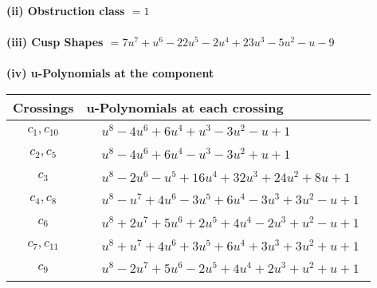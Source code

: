 \documentclass[1p]{elsarticle_modified}
\theoremstyle{definition}
\begin{document}
\flushleft \textbf{(ii) Obstruction class $= 1$}\\~\\
\flushleft \textbf{(iii) Cusp Shapes $= 7 u^7+u^6-22 u^5-2 u^4+23 u^3-5 u^2- u-9$}\\~\\
\newpage\renewcommand{\arraystretch}{1}
\flushleft \textbf{(iv) u-Polynomials at the component}\newline \\
\begin{tabular}{m{50pt}|m{274pt}}
Crossings & \hspace{64pt}u-Polynomials at each crossing \\
\hline $$\begin{aligned}c_{1},c_{10}\end{aligned}$$&$\begin{aligned}
&u^8-4 u^6+6 u^4+u^3-3 u^2- u+1
\end{aligned}$\\
\hline $$\begin{aligned}c_{2},c_{5}\end{aligned}$$&$\begin{aligned}
&u^8-4 u^6+6 u^4- u^3-3 u^2+u+1
\end{aligned}$\\
\hline $$\begin{aligned}c_{3}\end{aligned}$$&$\begin{aligned}
&u^8-2 u^6- u^5+16 u^4+32 u^3+24 u^2+8 u+1
\end{aligned}$\\
\hline $$\begin{aligned}c_{4},c_{8}\end{aligned}$$&$\begin{aligned}
&u^8- u^7+4 u^6-3 u^5+6 u^4-3 u^3+3 u^2- u+1
\end{aligned}$\\
\hline $$\begin{aligned}c_{6}\end{aligned}$$&$\begin{aligned}
&u^8+2 u^7+5 u^6+2 u^5+4 u^4-2 u^3+u^2- u+1
\end{aligned}$\\
\hline $$\begin{aligned}c_{7},c_{11}\end{aligned}$$&$\begin{aligned}
&u^8+u^7+4 u^6+3 u^5+6 u^4+3 u^3+3 u^2+u+1
\end{aligned}$\\
\hline $$\begin{aligned}c_{9}\end{aligned}$$&$\begin{aligned}
&u^8-2 u^7+5 u^6-2 u^5+4 u^4+2 u^3+u^2+u+1
\end{aligned}$\\
\hline
\end{tabular}\\~\\
\end{document}
